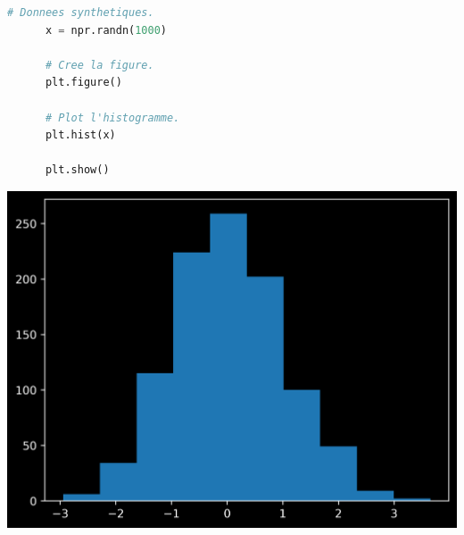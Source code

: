 \documentclass[aspectratio=169]{beamer}
\begin{document}
\begin{frame}[fragile]{}{}
  \vfill
  \begin{minipage}{.48\textwidth}
    \begin{lstlisting}[language=Python]
      # Donnees synthetiques.
      x = npr.randn(1000)

      # Cree la figure.
      plt.figure()

      # Plot l'histogramme.
      plt.hist(x)

      plt.show()
    \end{lstlisting}
  \end{minipage}%
  \hfill
  \begin{minipage}{.48\textwidth}
    \centering
    \includegraphics[width=\textwidth]{hist_plot_default}
  \end{minipage}
  \vfill
\end{frame}
\end{document}
